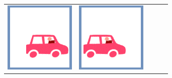 \documentclass[12pt, a4paper]{article}
\begin{document}
\begin{minipage}{\textwidth}
\begin{table}[H]
\begin{tabulary}{\linewidth}{|C|CCCC|}
				\vspace{0.01cm}\includegraphics[width=\linewidth]{option3} &
				\vspace{0.01cm}\includegraphics[width=\linewidth]{option2} &

\end{tabulary}
\end{table}
\end{minipage}
\end{document}
